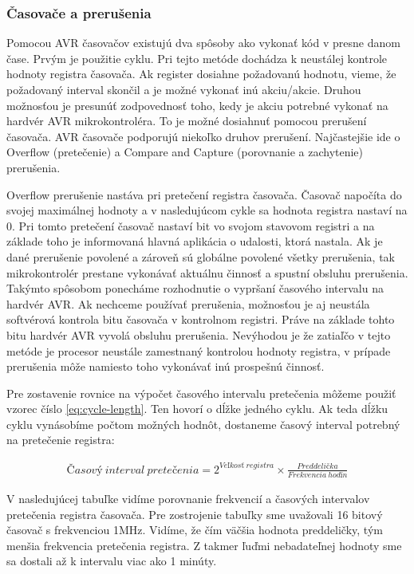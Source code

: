 \subsubsection{Časovače a prerušenia} \label{subsec:timers-interrupts}
Pomocou AVR časovačov existujú dva spôsoby ako vykonať kód v presne danom čase. Prvým je použitie cyklu.
Pri tejto metóde dochádza k neustálej kontrole hodnoty registra časovača. Ak register dosiahne požadovanú hodnotu, vieme, že požadovaný interval skončil
a je možné vykonať inú akciu/akcie. Druhou možnosťou je presunúť zodpovednosť toho, kedy je akciu potrebné vykonať na hardvér AVR mikrokontroléra.
To je možné dosiahnuť pomocou prerušení časovača. AVR časovače podporujú niekoľko druhov prerušení.
Najčastejšie ide o Overflow (pretečenie) a Compare and Capture (porovnanie a zachytenie) prerušenia. \par
Overflow prerušenie nastáva pri pretečení registra časovača. Časovač napočíta do svojej maximálnej hodnoty a v nasledujúcom cykle sa hodnota registra nastaví na 0.
Pri tomto pretečení časovač nastaví bit vo svojom stavovom registri a na základe toho je informovaná hlavná aplikácia o udalosti, ktorá nastala. Ak je dané prerušenie
povolené a zároveň sú globálne povolené všetky prerušenia, tak mikrokontrolér prestane vykonávať aktuálnu činnosť a spustní obsluhu prerušenia. Takýmto spôsobom
ponecháme rozhodnutie o vypršaní časového intervalu na hardvér AVR. Ak nechceme používať prerušenia, možnosťou je aj neustála softvérová kontrola bitu časovača v kontrolnom registri.
Práve na základe tohto bitu hardvér AVR vyvolá obsluhu prerušenia. Nevýhodou je že zatiaľčo v tejto metóde je procesor neustále zamestnaný kontrolou
hodnoty registra, v prípade prerušenia môže namiesto toho vykonávať inú prospešnú činnosť. \par
Pre zostavenie rovnice na výpočet časového intervalu pretečenia môžeme použiť vzorec číslo \ref{eq:cycle-length}. Ten hovorí o dĺžke jedného cyklu. Ak teda dĺžku cyklu
vynásobíme počtom možných hodnôt, dostaneme časový interval potrebný na pretečenie registra:

\begin{equation} \label{eq:overflow-frequency}
    \begin{aligned}
        Časový\:interval\:pretečenia =  2^{Veľkosť\:registra}  \times \frac{Preddelička}{Frekvencia\:hodín}
    \end{aligned}
\end{equation}

V nasledujúcej tabuľke vidíme porovnanie frekvencií a časových intervalov pretečenia registra časovača. Pre zostrojenie tabuľky sme uvažovali 16 bitový časovač
s frekvenciou 1MHz.  Vidíme, že čím väčšia hodnota preddeličky, tým menšia frekvencia
pretečenia registra. Z takmer ľuďmi nebadateľnej hodnoty sme sa dostali až k intervalu viac ako 1 minúty.

